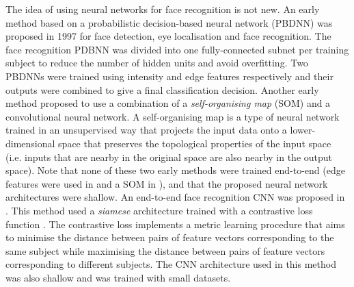 \documentclass[conference]{IEEEtran}
\begin{document}
The idea of using neural networks for face recognition is not new. An early method based on a probabilistic decision-based neural network (PBDNN) \cite{lin1997face} was proposed in 1997 for face detection, eye localisation and face recognition. The face recognition PDBNN was divided into one fully-connected subnet per training subject to reduce the number of hidden units and avoid overfitting. Two PBDNNs were trained using intensity and edge features respectively and their outputs were combined to give a final classification decision. Another early method \cite{lawrence1997face} proposed to use a combination of a \textit{self-organising map} (SOM) and a convolutional neural network. A self-organising map \cite{kohonen1998self} is a type of neural network trained in an unsupervised way that projects the input data onto a lower-dimensional space that preserves the topological properties of the input space (i.e. inputs that are nearby in the original space are also nearby in the output space). Note that none of these two early methods were trained end-to-end (edge features were used in \cite{lin1997face} and a SOM in \cite{lawrence1997face}), and that the proposed neural network architectures were shallow. An end-to-end face recognition CNN was proposed in \cite{chopra2005learning}. This method used a \textit{siamese} architecture trained with a contrastive loss function \cite{bromley1994signature}. The contrastive loss implements a metric learning procedure that aims to minimise the distance between pairs of feature vectors corresponding to the same subject while maximising the distance between pairs of feature vectors corresponding to different subjects. The CNN architecture used in this method was also shallow and was trained with small datasets.
\end{document}
